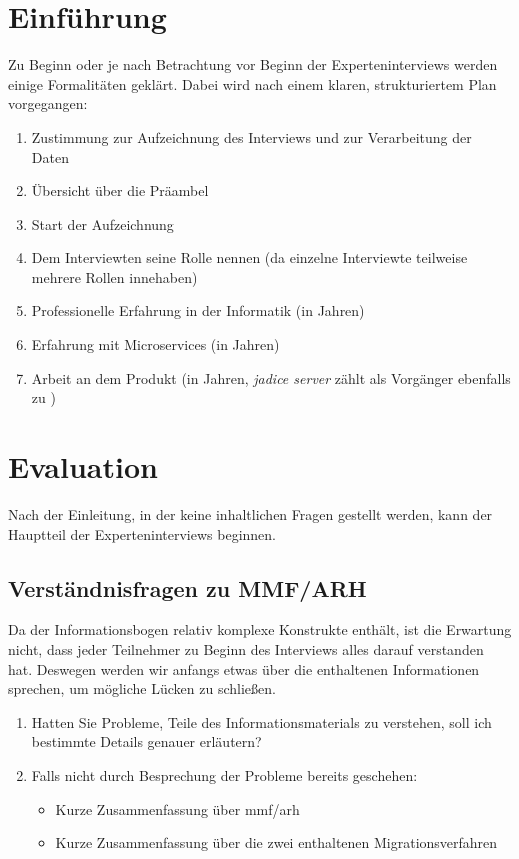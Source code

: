 \section{Einführung}

Zu Beginn oder je nach Betrachtung vor Beginn der Experteninterviews werden einige Formalitäten geklärt.
Dabei wird nach einem klaren, strukturiertem Plan vorgegangen:

\begin{enumerate}
	\item Zustimmung zur Aufzeichnung des Interviews und zur Verarbeitung der Daten
	\item Übersicht über die Präambel
	\item Start der Aufzeichnung
	\item Dem Interviewten seine Rolle nennen (da einzelne Interviewte teilweise mehrere Rollen innehaben)
	\item Professionelle Erfahrung in der Informatik (in Jahren)
	\item Erfahrung mit Microservices (in Jahren)
	\item Arbeit an dem Produkt (in Jahren, \emph{jadice server} zählt als Vorgänger ebenfalls zu \jf)
\end{enumerate}

\section{Evaluation}

Nach der Einleitung, in der keine inhaltlichen Fragen gestellt werden, kann der Hauptteil der Experteninterviews beginnen.

\subsection{Verständnisfragen zu MMF/ARH}
\label{sec:verständnisfragen}

Da der Informationsbogen relativ komplexe Konstrukte enthält, ist die Erwartung nicht, dass jeder Teilnehmer zu Beginn des Interviews alles darauf verstanden hat.
Deswegen werden wir anfangs etwas über die enthaltenen Informationen sprechen, um mögliche Lücken zu schließen.

\begin{enumerate}
	\item Hatten Sie Probleme, Teile des Informationsmaterials zu verstehen, soll ich bestimmte Details genauer erläutern?
	\item Falls nicht durch Besprechung der Probleme bereits geschehen:
	\begin{itemize}
		\item Kurze Zusammenfassung über \gls{mmf}/\gls{arh}
		\item Kurze Zusammenfassung über die zwei enthaltenen Migrationsverfahren
	\end{itemize}
\end{enumerate}


